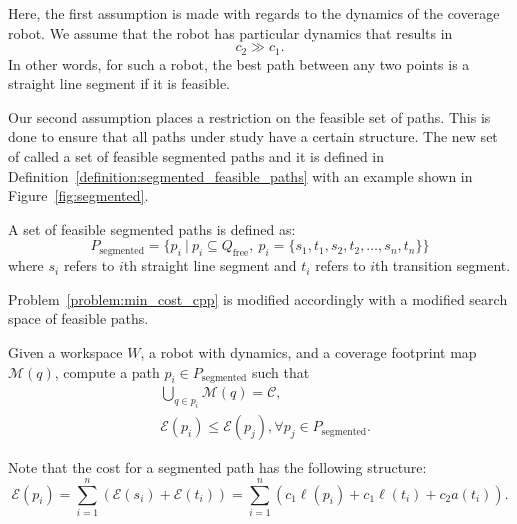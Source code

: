 \documentclass[../main.tex]{subfiles}
\begin{document}
Here, the first assumption is made with regards to the dynamics of the coverage robot. We assume that the robot has particular dynamics that results in
\begin{equation}
	c_2 \gg c_1.
\end{equation}
In other words, for such a robot, the best path between any two points is a straight line segment if it is feasible.

Our second assumption places a restriction on the feasible set of paths. This is done to ensure that all paths under study have a certain structure. The new set of called a set of feasible segmented paths and it is defined in Definition~\ref{definition:segmented_feasible_paths} with an example shown in Figure~\ref{fig:segmented}.
\begin{definition}
\label{definition:segmented_feasible_paths}
A set of feasible segmented paths is defined as:
	\begin{equation}
		P_{\text{segmented}}=\{p_i\ |\ p_i\subseteq Q_{\text{free}},\  p_i=\{s_1,t_1,s_2,t_2,\dots,s_n,t_n\}\}
	\end{equation}
	where $s_i$ refers to $i$th straight line segment and $t_i$ refers to $i$th transition segment.
\end{definition}

Problem~\ref{problem:min_cost_cpp} is modified accordingly with a modified search space of feasible paths.
\begin{problem}
\label{problem:min_cost_cpp_with_lines}
	Given a workspace $W$, a robot with dynamics, and a coverage footprint map $\mathcal{M}(q)$, compute a path $p_i\in P_{\text{segmented}}$ such that
	\begin{equation}
	\label{condition:full_coverage_2}
	\begin{aligned}
		& \bigcup_{q\in p_i}\mathcal{M}(q)=\mathcal{C},\\
		& \mathcal{E}(p_i)\leq\mathcal{E}(p_j), \forall p_j\in P_{\text{segmented}}.
	\end{aligned}
	\end{equation}
\end{problem}

Note that the cost for a segmented path has the following structure:
\begin{equation}
	\label{eq:segmented_cost}
	\mathcal{E}(p_i)=\sum_{i=1}^n(\mathcal{E}(s_i)+\mathcal{E}(t_i))=\sum_{i=1}^n(c_1\ell(p_i)+c_1\ell(t_i)+c_2a(t_i)).
\end{equation}
\end{document}
